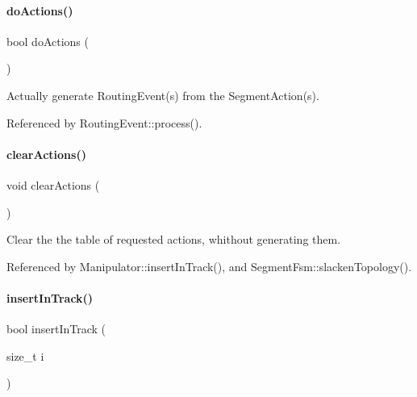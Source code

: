 \mbox{\label{classKite_1_1SegmentFsm_abbcf429498049478d4d8ab94cdb4a022}} 
\paragraph{\texorpdfstring{do\+Actions()}{doActions()}}
{\footnotesize\ttfamily bool do\+Actions (\begin{DoxyParamCaption}{ }\end{DoxyParamCaption})}

Actually generate Routing\+Event(s) from the Segment\+Action(s). 

Referenced by Routing\+Event\+::process().

\mbox{\label{classKite_1_1SegmentFsm_a4cf911f1f4e5ac588d502c9d069a1bde}} 
\paragraph{\texorpdfstring{clear\+Actions()}{clearActions()}}
{\footnotesize\ttfamily void clear\+Actions (\begin{DoxyParamCaption}{ }\end{DoxyParamCaption})\hspace{0.3cm}{\ttfamily [inline]}}

Clear the the table of requested actions, whithout generating them. 

Referenced by Manipulator\+::insert\+In\+Track(), and Segment\+Fsm\+::slacken\+Topology().

\mbox{\label{classKite_1_1SegmentFsm_a7140b507da2cab137d968a037bed19df}} 
\paragraph{\texorpdfstring{insert\+In\+Track()}{insertInTrack()}}
{\footnotesize\ttfamily bool insert\+In\+Track (\begin{DoxyParamCaption}\item[{size\+\_\+t}]{i }\end{DoxyParamCaption})}

